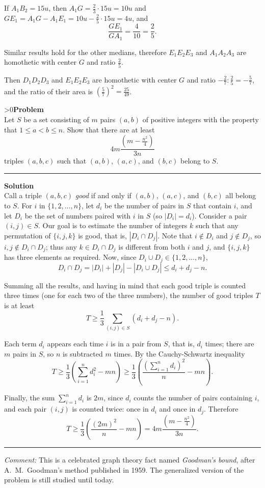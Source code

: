\documentclass[12pt,oneside,a4paper]{book}
\newcounter{probnum}
\newcounter{solnum}
\newcommand{\prob}{\ifnum\value{probnum}>0\newpage\fi\setcounter{solnum}{0}\stepcounter{probnum}\textbf{Problem \theprobnum}\\}
\newcommand{\comment}{\medskip\hrule\medbreak\emph{Comment: }}
\newcommand{\sol}{\medskip\hrule\medbreak\textbf{Solution}\\}
\begin{document}
If $A_1B_2 = 15u$, then $A_1G = \frac23\cdot 15u = 10u$ and $GE_1 = A_1G - A_1E_1 = 10u - \frac25\cdot 15u = 4u$, and
\[\frac{GE_1}{GA_1} = \frac 4{10} = \frac25.\]

Similar results hold for the other medians, therefore $E_1E_2E_3$ and $A_1A_2A_3$ are homothetic with center $G$ and ratio $\frac25$.

Then $D_1D_2D_3$ and $E_1E_2E_3$ are homothetic with center $G$ and ratio $-\frac 27 : \frac25 = -\frac57$, and the ratio of their area is $\left(\frac 57\right)^2 = \frac{25}{49}$.

\prob Let $S$ be a set consisting of $m$ pairs $(a,b)$ of positive integers with the property that $1\le a<b\le n$. Show that there are at least
\[4m\frac{(m-\frac{n^2}4)}{3n}\]
triples $(a,b,c)$ such that $(a,b)$, $(a,c)$, and $(b,c)$ belong to $S$.

\sol
Call a triple $(a,b,c)$ \emph{good} if and only if $(a,b)$, $(a,c)$, and $(b,c)$ all belong to $S$. For $i$ in $\{1,2,\ldots,n\}$, let $d_i$ be the number of pairs in $S$ that contain $i$, and let $D_i$ be the set of numbers paired with $i$ in $S$ (so $|D_i| = d_i$). Consider a pair $(i,j)\in S$. Our goal is to estimate the number of integers $k$ such that any permutation of $\{i,j,k\}$ is good, that is, $|D_i\cap D_j|$. Note that $i\notin D_i$ and $j\notin D_j$, so $i,j\notin D_i\cap D_j$; thus any $k\in D_i\cap D_j$ is different from both $i$ and $j$, and $\{i,j,k\}$ has three elements as required. Now, since $D_i\cup D_j \in \{1,2,\ldots,n\}$,
\[D_i\cap D_j = |D_i| + |D_j| - |D_i\cup D_j| \le d_i + d_j - n.\]

Summing all the results, and having in mind that each good triple is counted three times (one for each two of the three numbers), the number of good triples $T$ is at least
\[T \ge \frac 13\sum_{(i,j)\in S}(d_i+d_j-n).\]

Each term $d_i$ appears each time $i$ is in a pair from $S$, that is, $d_i$ times; there are $m$ pairs in $S$, so $n$ is subtracted $m$ times. By the Cauchy-Schwartz inequality
\[T \ge \frac13\left(\sum_{i=1}^n d_i^2 - mn\right) \ge \frac13\left(\frac{\left(\sum_{i=1}^n d_i\right)^2}n - mn\right).\]

Finally, the sum $\sum_{i=1}^n d_i$ is $2m$, since $d_i$ counts the number of pairs containing $i$, and each pair $(i,j)$ is counted twice: once in $d_i$ and once in $d_j$. Therefore
\[T \ge \frac13\left(\frac{(2m)^2}n - mn\right) = 4m\frac{(m-\frac{n^2}4)}{3n}.\]

\comment
This is a celebrated graph theory fact named \emph{Goodman's bound}, after A.~M.~Goodman's method published in 1959. The generalized version of the problem is still studied until today.
\end{document}
